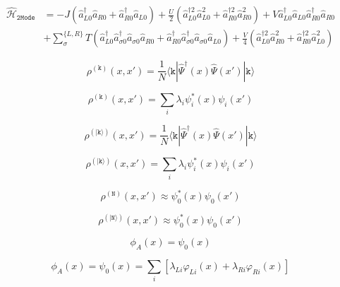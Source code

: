 \documentclass[aps,floatfix,showpacs,pra]{revtex4}
\begin{document}
\begin{equation}
\begin{split}
 \hat{\mathcal{H}}_\mathtt{2Mode} &= - J (\hat{a}_{L0}^\dagger \hat{a}_{R0} + \hat{a}_{R0}^\dagger \hat{a}_{L0}) + \frac{U}{2} (\hat{a}_{L0}^{\dagger 2} \hat{a}_{L0}^2 + \hat{a}_{R0}^{\dagger 2} \hat{a}_{R0}^2) + V \hat{a}_{L0}^\dagger \hat{a}_{L0} \hat{a}_{R0}^\dagger \hat{a}_{R0} \\
 &+ \sum\limits_{\sigma}^{\{L,R\}} T (\hat{a}_{L0}^\dagger \hat{a}_{\sigma 0}^\dagger \hat{a}_{\sigma 0} \hat{a}_{R0} + \hat{a}_{R0}^\dagger \hat{a}_{\sigma 0}^\dagger \hat{a}_{\sigma 0} \hat{a}_{L0}) + \frac{V}{4} (\hat{a}_{L0}^{\dagger 2} \hat{a}_{R0}^2 + \hat{a}_{R0}^{\dagger 2} \hat{a}_{L0}^2)
 \end{split}
\end{equation}

\begin{equation}
 \rho^{(\mathtt{k})}(x,x') = \frac{1}{N} \langle \mathtt{k} | \hat{\Psi}^\dagger(x) \hat{\Psi}(x') | \mathtt{k} \rangle
\end{equation}

\begin{equation}
 \rho^{(\mathtt{k})}(x,x') = \sum\limits_i \lambda_i \psi_i^*(x) \psi_i(x')
\end{equation}

\begin{equation}
 \rho^{(\mathtt{|k\rangle})}(x,x') = \frac{1}{N} \langle \mathtt{k} | \hat{\Psi}^\dagger(x) \hat{\Psi}(x') | \mathtt{k} \rangle
\end{equation}

\begin{equation}
 \rho^{(\mathtt{|k\rangle})}(x,x') = \sum\limits_i \lambda_i \psi_i^*(x) \psi_i(x')
\end{equation}

\begin{equation}
 \rho^{(\mathtt{N})}(x,x') \approx \psi_0^*(x) \psi_0(x')
\end{equation}

\begin{equation}
 \rho^{(\mathtt{|N\rangle})}(x,x') \approx \psi_0^*(x) \psi_0(x')
\end{equation}

\begin{equation}
 \phi_A(x) = \psi_0(x)
\end{equation}

\begin{equation}
 \phi_A(x) = \psi_0(x) = \sum\limits_i [\lambda_{Li} \varphi_{Li}(x) + \lambda_{Ri} \varphi_{Ri}(x)]
\end{equation}
\end{document}
